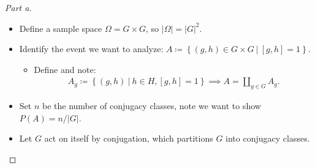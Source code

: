 \begin{solution}

\envlist

\begin{proof}[Part a]

\envlist

\begin{itemize}
\item
  Define a sample space \(\Omega = G \times G\), so
  \({\left\lvert {\Omega} \right\rvert} = {\left\lvert {G} \right\rvert}^2\).
\item
  Identify the event we want to analyze:
  \(A \coloneqq\left\{{(g,h) \in G\times G {~\mathrel{\Big|}~}[g,h] = 1}\right\}\).

  \begin{itemize}
  \tightlist
  \item
    Define and note:
    \begin{align*}
    A_g \coloneqq\left\{{(g, h) {~\mathrel{\Big|}~}h\in H, [g, h] = 1}\right\} \implies A = {\coprod}_{g\in G} A_g
    .\end{align*}
  \end{itemize}
\item
  Set \(n\) be the number of conjugacy classes, note we want to show
  \(P(A) = n / {\left\lvert {G} \right\rvert}\).
\item
  Let \(G\) act on itself by conjugation, which partitions \(G\) into
  conjugacy classes.


\end{itemize}
\end{proof}
\end{solution}
